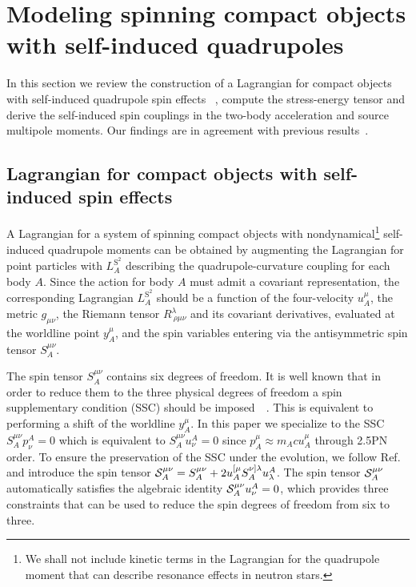 \documentclass[aps, prd,
twocolumn,%
superscriptaddress,
showpacs, nofootinbib, eqsecnum, amsmath, amssymb, floatfix
]{revtex4}
\begin{document}
\section{Modeling spinning compact objects with self-induced quadrupoles}
\label{sec:modelling}

In this section we review the construction of a Lagrangian for compact objects
with self-induced quadrupole spin effects
~\cite{Tulczyjew1959,1980AnPhy.130..188B,PortoRothstein2006,Porto:2008jj,
Steinhoff:2010zz},
compute the stress-energy tensor and derive the self-induced spin couplings in
the two-body acceleration and source multipole moments. Our findings are in
agreement with previous
results~\cite{Poisson:1997ha,Damour01c,Steinhoff:2010zz,Porto:2012x}.

\subsection{Lagrangian for compact objects with self-induced spin effects}

A Lagrangian for a system of spinning compact objects with
nondynamical\footnote{We shall not include kinetic terms in the
Lagrangian
  for the quadrupole moment that can describe resonance effects in neutron
  stars.} self-induced quadrupole moments can be obtained by augmenting the
Lagrangian for point particles with $L^{\text{S}^2}_A$ describing
the quadrupole-curvature coupling for each body $A$. Since the
action for body $A$ must admit a covariant representation, the
corresponding Lagrangian $L^{\text{S}^2}_A$ should be a function of
the four-velocity $u_A^\mu$, the metric $g_{\mu\nu}$, the Riemann
tensor $R^\lambda_{~\rho\mu\nu}$ and its covariant derivatives,
evaluated at the worldline point $y_A^\mu$, and the spin variables
entering via the antisymmetric spin tensor $S_A^{\mu\nu}$.

The spin tensor $S_A^{\mu\nu}$ contains six degrees of freedom. It
is well known that in order to reduce them to the three physical
degrees of freedom a spin supplementary condition (SSC) should be
imposed~~\cite{BOC79}. This is equivalent to performing a shift of
the worldline $y_A^\mu$. In this paper we specialize to the SSC
$S_A^{\mu\nu}p^A_\nu=0$ which is equivalent to
$S_A^{\mu\nu}u^A_\nu=0$ since $p_A^\mu \approx m_A c u_A^\mu$
through 2.5PN order. To ensure the preservation of the SSC under the
evolution, we follow Ref.~\cite{Porto:2008jj} and introduce the spin
tensor ${{{{\cal{S}}}}}_A^{\mu\nu} =S_A^{\mu\nu} + 2 u_A^{[\mu}
S_A^{\nu]\lambda} u^A_\lambda$. The spin tensor
${{{{\cal{S}}}}}_A^{\mu\nu}$ automatically satisfies the algebraic
identity ${{{{\cal{S}}}}}^{\mu\nu}_A u^A_\nu = 0$, which provides
three constraints that can be used to reduce the spin degrees of
freedom from six to three.
\end{document}
